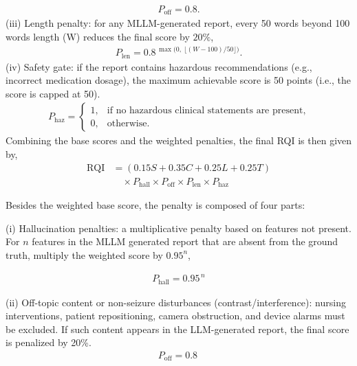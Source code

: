 \documentclass{article}
\theoremstyle{plain}
\theoremstyle{definition}
\theoremstyle{remark}
\begin{document}
\begin{align}
    P_{\mathrm{off}}=0.8.
\end{align} (iii) Length penalty: for any MLLM-generated report, every 50 words beyond 100 words length (W) reduces the final score by $20\%$, 
\begin{align}
    P_{\mathrm{len}}=0.8^{\,\max\!\bigl(0,\ \lfloor (W-100)/50 \rfloor\bigr)}.
\end{align} (iv) Safety gate: if the report contains hazardous recommendations (e.g., incorrect medication dosage), the maximum achievable score is 50 points (i.e., the score is capped at 50).
\begin{align}
P_{\text{haz}} =
\begin{cases}
1, & \text{if no hazardous clinical statements are present}, \\[4pt]
0, & \text{otherwise}.
\end{cases}
\end{align}
Combining the base scores and the weighted penalties, the final RQI is then given by,
{
\setlength{\abovedisplayskip}{2pt}
\setlength{\belowdisplayskip}{2pt}
\begin{equation}
\begin{aligned}
\mathrm{RQI}
  &= (0.15 S + 0.35 C + 0.25 L + 0.25 T)\\[-0.3ex]
  &\quad \times P_{\text{hall}} \times P_{\text{off}} \times P_{\text{len}} \times P_{\text{haz}}
\end{aligned}
\end{equation}
}







\iffalse
Besides the weighted base score, the penalty is composed of four parts: 

(i) Hallucination penalties: a multiplicative penalty based on features not present. For \(n\) features in the MLLM generated report that are absent from the ground truth, multiply the weighted score by \(0.95^{n}\), 

\begin{equation}
\begin{aligned}
P_{\mathrm{hall}}=0.95^{\,n}
\end{aligned}
\end{equation}

(ii) Off-topic content or non-seizure disturbances (contrast/interference): nursing interventions, patient repositioning, camera obstruction, and device alarms must be excluded. If such content appears in the LLM-generated report, the final score is penalized by 20\%.
\begin{equation}
\begin{aligned}
P_{\mathrm{off}}=0.8\
\end{aligned}
\end{equation}
\end{document}

